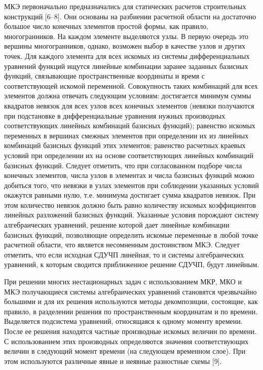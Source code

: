 \documentclass[a4paper,12pt]{article}
\begin{document}
МКЭ первоначально предназначались для статических расчетов
строительных конструкций [6--8]. Они основаны на разбиении расчетной
области на достаточно большое число конечных элементов простой формы,
как правило, многогранников.  На каждом элементе выделяются узлы. В
первую очередь это вершины многогранников, однако, возможен выбор в
качестве узлов и других точек. Для каждого элемента для всех искомых
из системы дифференциальных уравнений функций ищутся линейные
комбинации заранее заданных базисных функций, связывающие
пространственные координаты и время с соответствующей искомой
переменной. Совокупность таких комбинаций для всех элементов должна
отвечать следующим условиям: достигается минимум суммы квадратов
невязок для всех узлов всех конечных элементов (невязки получаются при
подстановке в дифференциальные уравнения нужных производных
соответствующих линейных комбинаций базисных функций); равенство
искомых переменных в вершинах смежных элементов при определении их из
линейных комбинаций базисных функций этих элементов; равенство
расчетных краевых условий при определении их на основе соответствующих
линейных комбинаций базисных функций. Следует отметить, что при
согласованном подборе числа конечных элементов, числа узлов в
элементах и числа базисных функций можно добиться того, что невязки в
узлах элементов при соблюдении указанных условий окажутся равными
нулю, т.е. минимума достигает сумма квадратов невязок.
При этом количество невязок должно быть равно количеству
искомых коэффициентов линейных разложений базисных функций.  Указанные
условия порождают систему алгебраических уравнений, решение которой
дает линейные комбинации базисных функций, позволяющие определить
искомые переменные в любой точке расчетной области, что является
несомненным достоинством МКЭ. Следует отметить, что если исходная
СДУЧП линейная, то и системы алгебраических уравнений, к которым
сводится приближенное решение СДУЧП, будут линейным.

При решении многих нестационарных задач с использованием МКР, МКО и
МКЭ получающиеся системы алгебраических уравнений становятся
чрезвычайно большими и для их решения используются методы
декомпозиции, состоящие, как правило, в разделении решения по
пространственным координатам и по времени.  Выделяется подсистема
уравнений, относящаяся к одному моменту времени.  После ее решения
находятся частные производные искомых величин по времени.  С
использованием этих производных определяются значения соответствующих
величин в следующий момент времени (на следующем временном слое). При
этом используются различные явные и неявные разностные схемы [9].
\end{document}

